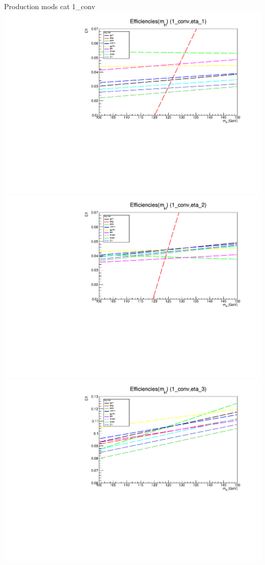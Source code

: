 \documentclass[10pt,UKenglish, leqno, xcolor = dvipsnames]{beamer}
\begin{document}
		\begin{frame}{Production mods cat 1\_conv}
			\vfill
			\centering
			\includegraphics[width=.475\textwidth]{../images/week_11/eff_all_prod_1_conv_eta_1.pdf}
			\includegraphics[width=.475\textwidth]{../images/week_11/eff_all_prod_1_conv_eta_2.pdf}
			\includegraphics[width=.475\textwidth]{../images/week_11/eff_all_prod_1_conv_eta_3.pdf}
			\vfill
		\end{frame}
	
\end{document}
